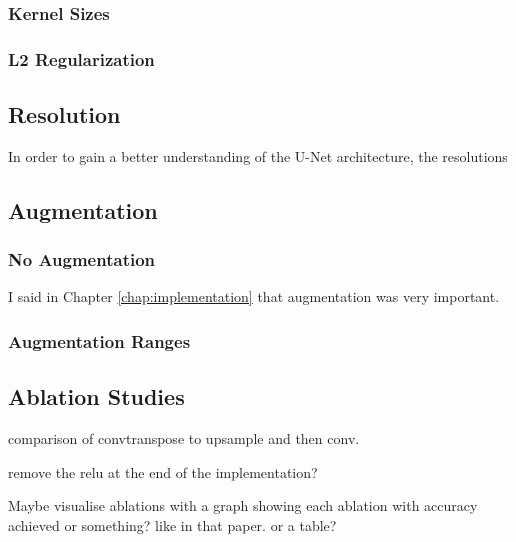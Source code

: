 \subsubsection{Kernel Sizes}

\subsubsection{L2 Regularization}

\subsection{Resolution}

In order to gain a better understanding of the U-Net architecture, the resolutions

\subsection{Augmentation}
\label{sec:evalaugmentation}

\subsubsection{No Augmentation}

I said in Chapter \ref{chap:implementation} that augmentation was very important.

\subsubsection{Augmentation Ranges}

\subsection{Ablation Studies}

comparison of convtranspose to upsample and then conv.

remove the relu at the end of the implementation?

Maybe visualise ablations with a graph showing each ablation with accuracy achieved or something? like in that paper. or a table?

